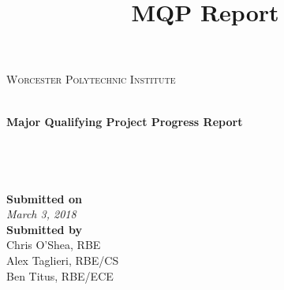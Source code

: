 \documentclass[letterpaper,12pt,titlepage]{article}
\title{MQP Report}
\begin{document}
\begin{titlepage}
\begin{center}
\begin{minipage}{0.4\textwidth}
\end{minipage}
\begin{minipage}{0.5\textwidth}
\centering
\textsc{Worcester Polytechnic Institute}
\end{minipage}
\\ 
\vspace*{1cm}
	\Huge
	\textbf{Major Qualifying Project Progress Report}\\
\vspace{1cm}
	\LARGE
	\\
\vspace{2cm}
	\Large
	\text{}\\
    \textbf{}\\
    \textbf{}\\
\vfill
\vspace{0.8cm}
	\LARGE
	\textbf{Submitted on} \\
    \Large
	\textit{March 3, 2018} \\
    
\vspace{0.8cm}
	\LARGE
	\textbf{Submitted by} \\
    \Large
	Chris O'Shea, RBE\\
	\Large
    Alex Taglieri, RBE/CS \\
	\Large
    Ben Titus, RBE/ECE \\
    
\vfill
\end{center}
\end{titlepage}

\newpage
	\tableofcontents
	\newpage
	\listoffigures
\newpage








%

% 
\pagebreak

{}

\begin{appendices}


\end{appendices}
\end{document}
